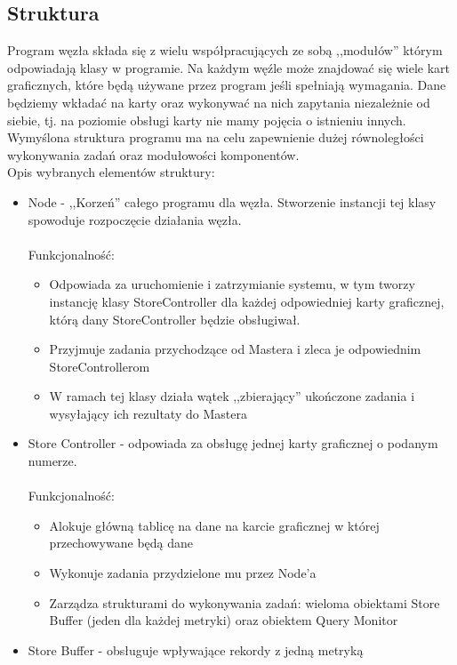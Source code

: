 \documentclass[paper=a4, fontsize=11pt]{scrartcl} %
\numberwithin{equation}{section} %
\numberwithin{figure}{section} %
\numberwithin{table}{section} %
\begin{document}
	\subsection{Struktura}
		Program węzła składa się z wielu współpracujących ze sobą ,,modułów'' którym odpowiadają klasy w programie. Na każdym węźle może znajdować się
		wiele kart graficznych, które będą używane przez program jeśli spełniają wymagania. Dane będziemy wkładać na karty oraz wykonywać na nich zapytania
		niezależnie od siebie, tj. na poziomie obsługi karty nie mamy pojęcia o istnieniu innych. Wymyślona struktura programu ma na celu zapewnienie dużej 
		równoległości wykonywania zadań oraz modułowości komponentów. \\
		Opis wybranych elementów struktury:
		\begin{itemize}
			\item Node - ,,Korzeń'' całego programu dla węzła. Stworzenie instancji tej klasy spowoduje rozpoczęcie działania węzła. \\ \\
				Funkcjonalność: 
				\begin{itemize}
					\item Odpowiada za uruchomienie i zatrzymianie systemu, w tym tworzy instancję klasy StoreController dla każdej odpowiedniej karty
						graficznej, którą dany StoreController będzie obsługiwał.
					\item Przyjmuje zadania przychodzące od Mastera i zleca je odpowiednim StoreControllerom
					\item W ramach tej klasy działa wątek ,,zbierający'' ukończone zadania i wysyłający ich rezultaty do Mastera
				\end{itemize}
			\item Store Controller - odpowiada za obsługę jednej karty graficznej o podanym numerze. \\ \\
				Funkcjonalność: 
				\begin{itemize}
					\item Alokuje główną tablicę na dane na karcie graficznej w której przechowywane będą dane
					\item Wykonuje zadania przydzielone mu przez Node'a
					\item Zarządza strukturami do wykonywania zadań: wieloma obiektami Store Buffer (jeden dla każdej metryki) oraz obiektem Query Monitor
				\end{itemize}
			\item Store Buffer - obsługuje wpływające rekordy z jedną metryką \\ \\

\end{itemize}
\end{document}
